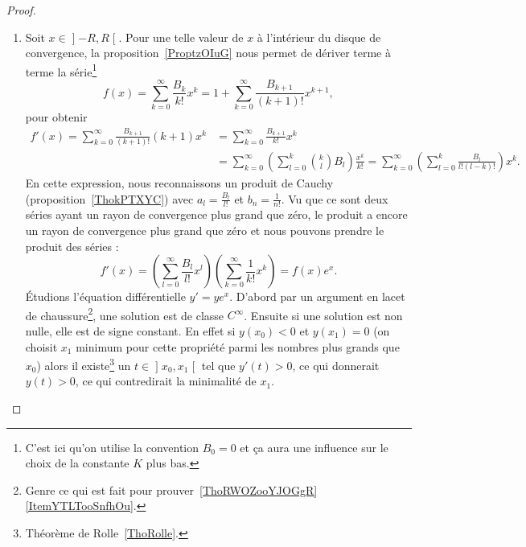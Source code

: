 \begin{proof}
\begin{enumerate}
		\item

		      Soit \( x\in\mathopen] -R , R \mathclose[\). Pour une telle valeur de \( x\) à l'intérieur du disque de convergence, la proposition~\ref{ProptzOIuG} nous permet de dériver terme à terme la série\footnote{C'est ici qu'on utilise la convention \( B_0=0\) et ça aura une influence sur le choix de la constante \( K\) plus bas.}
			      \begin{equation}
				      f(x)=\sum_{k=0}^{\infty}\frac{ B_k }{ k! }x^k=1+\sum_{k=0}^{\infty}\frac{ B_{k+1} }{ (k+1)! }x^{k+1},
			      \end{equation}
			      pour obtenir
			      \begin{subequations}
				      \begin{align}
					      f'(x)=\sum_{k=0}^{\infty}\frac{ B_{k+1} }{ (k+1)! }(k+1)x^k & =\sum_{k=0}^{\infty}\frac{ B_{k+1} }{ k! }x^k                                                                                                               \\
					                                                                  & =\sum_{k=0}^{\infty}\left( \sum_{l=0}^k{k\choose l}B_l \right)\frac{ x^k }{ k! }=\sum_{k=0}^{\infty}\left( \sum_{l=0}^k\frac{ B_l }{ l!(l-k)! } \right)x^k.
				      \end{align}
			      \end{subequations}
			      En cette expression, nous reconnaissons un produit de Cauchy (proposition~\ref{ThokPTXYC}) avec \( a_l=\frac{ B_l }{ l! }\) et \( b_n=\frac{ 1 }{ n! }\). Vu que ce sont deux séries ayant un rayon de convergence plus grand que zéro, le produit a encore un rayon de convergence plus grand que zéro et nous pouvons prendre le produit des séries :
			      \begin{equation}
				      f'(x)=\left( \sum_{l=0}^{\infty}\frac{ B_l }{ l! }x^l \right)\left( \sum_{k=0}^{\infty}\frac{1}{ k! }x^k \right)=f(x) e^{x}.
			      \end{equation}
			      Étudions l'équation différentielle \( y'=ye^x\). D'abord par un argument en lacet de chaussure\footnote{Genre ce qui est fait pour prouver~\ref{ThoRWOZooYJOGgR}\ref{ItemYTLTooSnfhOu}.}, une solution est de classe \(  C^{\infty}\). Ensuite si une solution est non nulle, elle est de signe constant. En effet si \( y(x_0)<0\) et \( y(x_1)=0\) (on choisit \( x_1\) minimum pour cette propriété parmi les nombres plus grands que \( x_0\)) alors il existe\footnote{Théorème de Rolle~\ref{ThoRolle}.} un \( t\in\mathopen] x_0 , x_1 \mathclose[\) tel que \( y'(t)>0\), ce qui donnerait \( y(t)>0\), ce qui contredirait la minimalité de \( x_1\).


\end{enumerate}
\end{proof}

